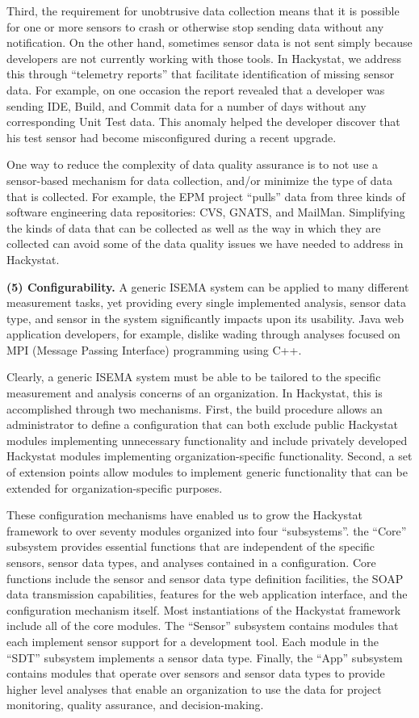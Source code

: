 \documentclass[10pt,twocolumn]{article}
\begin{document}
Third, the requirement for unobtrusive data collection means that it is
possible for one or more sensors to crash or otherwise stop sending data
without any notification. On the other hand, sometimes sensor data is not
sent simply because developers are not currently working with those tools.
In Hackystat, we address this through ``telemetry reports'' that facilitate
identification of missing sensor data. For example, on one occasion the
report revealed that a developer was sending IDE, Build, and Commit data
for a number of days without any corresponding Unit Test data. This anomaly
helped the developer discover that his test sensor had become misconfigured
during a recent upgrade.

One way to reduce the complexity of data quality assurance is to not use a
sensor-based mechanism for data collection, and/or minimize the type of
data that is collected. For example, the EPM project ``pulls'' data from
three kinds of software engineering data repositories: CVS, GNATS, and
MailMan.  Simplifying the kinds of data that can be collected as well as
the way in which they are collected can avoid some of the data quality
issues we have needed to address in Hackystat.

{\bf (5) Configurability.} A generic ISEMA system can be applied to many
different measurement tasks, yet providing every
single implemented analysis, sensor data type, and sensor in the system
significantly impacts upon its usability.   Java web application
developers, for example, dislike wading through analyses focused on MPI
(Message Passing Interface) programming using C++.   

Clearly, a generic ISEMA system must be able to be tailored to the specific
measurement and analysis concerns of an organization. In Hackystat, this is
accomplished through two mechanisms. First, the build procedure allows an
administrator to define a configuration that can both exclude public
Hackystat modules implementing unnecessary functionality and include
privately developed Hackystat modules implementing organization-specific
functionality. Second, a set of extension points allow modules to implement
generic functionality that can be extended for organization-specific
purposes.

These configuration mechanisms have enabled us to grow the Hackystat
framework to over seventy modules organized into four ``subsystems''.  the
``Core'' subsystem provides essential functions that are independent of the
specific sensors, sensor data types, and analyses contained in a
configuration.  Core functions include the sensor and sensor data type
definition facilities, the SOAP data transmission capabilities, features
for the web application interface, and the configuration mechanism itself.
Most instantiations of the Hackystat framework include all of the core
modules. The ``Sensor'' subsystem contains modules that each implement sensor
support for a development tool.  Each module in the ``SDT'' subsystem
implements a sensor data type. Finally, the ``App'' subsystem contains
modules that operate over sensors and sensor data types to provide higher
level analyses that enable an organization to use the data for project
monitoring, quality assurance, and decision-making.
\end{document}
